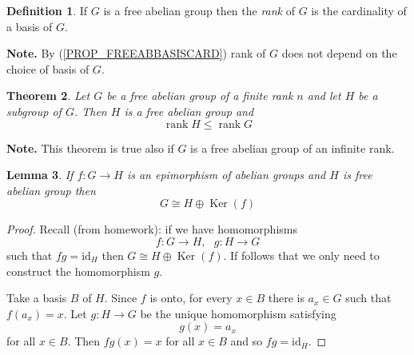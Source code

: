 \documentclass[12pt, letterpaper, oneside]{article}
\theoremstyle{plain}
\newtheorem{theorem}{Theorem}[section]
\newtheorem{lemma}[theorem]{Lemma}
\theoremstyle{definition}
\newtheorem{definition}[theorem]{Definition}
\newcommand{\id}{\mathrm{id}}
\newcommand{\Ker}{\operatorname{Ker}}
\newcommand{\rank}{\operatorname{rank}}
\newcommand{\vs}{\vskip 5mm}
\begin{document}
\vs

\begin{definition}
If $G$ is a free abelian group then the \emph{rank} of $G$ is the cardinality of a basis of $G$.  
\end{definition}

\textbf{Note.} 
By (\ref{PROP_FREEABBASISCARD}) rank of $G$ does not depend on the choice of basis of $G$.

\vs

\begin{theorem}
\label{THM_FREEABSUBGP}
Let $G$ be a free abelian group of a finite rank $n$ and let $H$ be a subgroup of $G$. 
Then $H$ is a free abelian group and 
$$\rank H \leq \rank G$$
\end{theorem}

\textbf{Note.} This theorem is true also if $G$ is a free abelian group of an infinite rank. 

\vs 

\begin{lemma}
\label{LEMMA_FREEABSPLIT}
If $f\colon G \to H$ is an epimorphism of abelian groups and $H$ is free abelian group
then 
$$G\cong H \oplus \Ker(f)$$
\end{lemma}


\begin{proof}
Recall (from homework): if we have homomorphisms
$$f\colon G\to H, \ \ \ g\colon H \to G$$
such that $fg = \id_{H}$ then $G\cong  H\oplus \Ker(f)$.  If follows that we only need 
to construct the homomorphism $g$.

Take a basis $B$ of $H$. Since $f$ is onto, for every $x\in B$ there is $a_{x}\in G$ such that 
$f(a_{x}) = x$.  Let $g\colon H \to G$ be the unique homomorphism satisfying 
$$g(x) = a_{x}$$
for all $x\in B$. Then $fg(x) = x$ for all $x\in B$ and so $fg = \id_{H}$. 
\end{proof}

\vs
\end{document}
